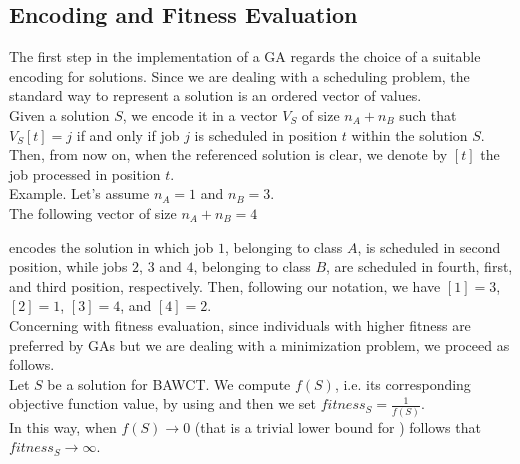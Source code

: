 \documentclass[opre,nonblindrev]{informs3} %
\begin{document}
\subsection{Encoding and Fitness Evaluation}
The first step in the implementation of a GA regards the choice of a suitable encoding for solutions. Since we are dealing with a scheduling problem, the standard way to represent a solution is an ordered vector of values.\\
Given a solution $S$, we encode it in a vector $V_S$ of size $n_A+n_B$ such that $V_S[t] = j$ if and only if job $j$ is scheduled in position $t$ within the solution $S$. Then, from now on, when the referenced solution is clear, we denote by $[t]$ the job processed in position $t$.\\
Example.
Let's assume $n_A = 1$ and $n_B=3$.\\
The following vector of size $n_A+n_B=4$
\begin{center}
\end{center}
 encodes the solution in which job $1$, belonging to class $A$, is scheduled in second position, while jobs $2$, $3$ and $4$, belonging to class $B$, are scheduled in fourth, first, and third position, respectively. Then, following our notation, we have $[1]=3$, $[2]=1$, $[3]=4$, and $[4]=2$.\\
 Concerning with fitness evaluation, since individuals with higher fitness are preferred by GAs but we are dealing with a minimization problem, we proceed as follows.\\Let $S$ be a solution for BAWCT. We compute $f(S)$, i.e. its corresponding objective function value, by using  and then we set $fitness_S = \frac{1}{f(S)}$.\\ In this way, when $f(S) \rightarrow 0 $ (that is a trivial lower bound for ) follows that $fitness_S \rightarrow \infty$.
\end{document}
